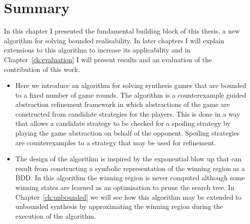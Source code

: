 \section{Summary}

In this chapter I presented the fundamental building block of this thesis, a new algorithm for solving bounded realisability. In later chapters I will explain extensions to this algorithm to increase its applicability and in Chapter~\ref{ch:evaluation} I will present results and an evaluation of the contribution of this work.

\begin{itemize}
    \item Here we introduce an algorithm for solving synthesis games that are bounded to a fixed number of game rounds. The algorithm is a counterexample guided abstraction refinement framework in which abstractions of the game are constructed from candidate strategies for the players. This is done in a way that allows a candidate strategy to be checked for a spoiling strategy by playing the game abstraction on behalf of the opponent. Spoiling strategies are counterexamples to a strategy that may be used for refinement.

    \item The design of the algorithm is inspired by the exponential blow up that can result from constructing a symbolic representation of the winning region as a BDD. In this algorithm the winning region is never computed although some winning states are learned as an optimisation to prune the search tree. In Chapter~\ref{ch:unbounded} we will see how this algorithm may be extended to unbounded synthesis by approximating the winning region during the execution of the algorithm.

\end{itemize}
